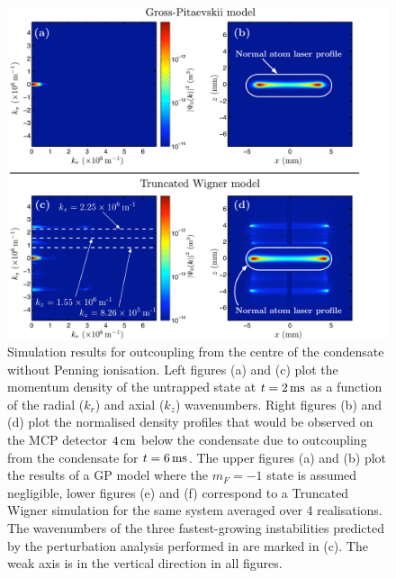 \begin{figure}
    \centering
    \includegraphics[trim=0 0 52 0,width=14cm]{ResonantOutcouplingNoPI}
    \caption{Simulation results for outcoupling from the centre of the condensate without Penning ionisation. Left figures (a) and (c) plot the momentum density of the untrapped state at $t=\unit[2]{ms}$ as a function of the radial ($k_r$) and axial ($k_z$) wavenumbers. Right figures (b) and (d) plot the normalised density profiles that would be observed on the MCP detector $\unit[4]{cm}$ below the condensate due to outcoupling from the condensate for $t=\unit[6]{ms}$. The upper figures (a) and (b) plot the results of a GP model where the $m_F=-1$ state is assumed negligible, lower figures (e) and (f) correspond to a Truncated Wigner simulation for the same system averaged over 4 realisations. The wavenumbers of the three fastest-growing instabilities predicted by the perturbation analysis performed in  are marked in (c). The weak axis is in the vertical direction in all figures.\label{Peaks:TheoryZeroDetuningNoPIResults}}
\end{figure}

